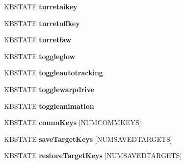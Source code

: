 \begin{DoxyCompactItemize}
\item 
K\+B\+S\+T\+A\+TE {\bfseries turretaikey}\hypertarget{structFIREKEYBOARDTYPE_a39fe0ba8362e1e50788b083906760471}{}\label{structFIREKEYBOARDTYPE_a39fe0ba8362e1e50788b083906760471}

\item 
K\+B\+S\+T\+A\+TE {\bfseries turretoffkey}\hypertarget{structFIREKEYBOARDTYPE_ac2298ea041067116b223adf1730a6e9d}{}\label{structFIREKEYBOARDTYPE_ac2298ea041067116b223adf1730a6e9d}

\item 
K\+B\+S\+T\+A\+TE {\bfseries turretfaw}\hypertarget{structFIREKEYBOARDTYPE_a19c6ecbb63367d410fa95d414ff3a3ef}{}\label{structFIREKEYBOARDTYPE_a19c6ecbb63367d410fa95d414ff3a3ef}

\item 
K\+B\+S\+T\+A\+TE {\bfseries toggleglow}\hypertarget{structFIREKEYBOARDTYPE_a81e84bb798d58de65ec85691bf85fd5a}{}\label{structFIREKEYBOARDTYPE_a81e84bb798d58de65ec85691bf85fd5a}

\item 
K\+B\+S\+T\+A\+TE {\bfseries toggleautotracking}\hypertarget{structFIREKEYBOARDTYPE_a9e5df573486b4ecbf44801900ae76d91}{}\label{structFIREKEYBOARDTYPE_a9e5df573486b4ecbf44801900ae76d91}

\item 
K\+B\+S\+T\+A\+TE {\bfseries togglewarpdrive}\hypertarget{structFIREKEYBOARDTYPE_a492f3d81853c8f5d52ec65e8b9da7faf}{}\label{structFIREKEYBOARDTYPE_a492f3d81853c8f5d52ec65e8b9da7faf}

\item 
K\+B\+S\+T\+A\+TE {\bfseries toggleanimation}\hypertarget{structFIREKEYBOARDTYPE_a7b9244afe7470cfe847d30d3f770ef9e}{}\label{structFIREKEYBOARDTYPE_a7b9244afe7470cfe847d30d3f770ef9e}

\item 
K\+B\+S\+T\+A\+TE {\bfseries comm\+Keys} \mbox{[}N\+U\+M\+C\+O\+M\+M\+K\+E\+YS\mbox{]}\hypertarget{structFIREKEYBOARDTYPE_afab6ee68e7d804d51897e922a83d82e3}{}\label{structFIREKEYBOARDTYPE_afab6ee68e7d804d51897e922a83d82e3}

\item 
K\+B\+S\+T\+A\+TE {\bfseries save\+Target\+Keys} \mbox{[}N\+U\+M\+S\+A\+V\+E\+D\+T\+A\+R\+G\+E\+TS\mbox{]}\hypertarget{structFIREKEYBOARDTYPE_a889243e8e19ae2924a115ec7426dc6c9}{}\label{structFIREKEYBOARDTYPE_a889243e8e19ae2924a115ec7426dc6c9}

\item 
K\+B\+S\+T\+A\+TE {\bfseries restore\+Target\+Keys} \mbox{[}N\+U\+M\+S\+A\+V\+E\+D\+T\+A\+R\+G\+E\+TS\mbox{]}\hypertarget{structFIREKEYBOARDTYPE_a11c5ed09f9bdf1386a388def12d91d24}{}\label{structFIREKEYBOARDTYPE_a11c5ed09f9bdf1386a388def12d91d24}


\end{DoxyCompactItemize}
